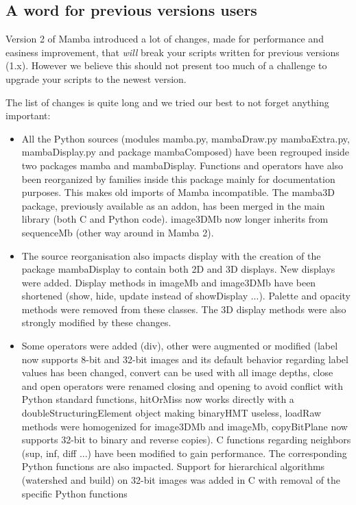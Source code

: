 \documentclass[a4paper,10pt,oneside]{article}
\begin{document}
\subsection{A word for previous versions users}
\label{cha:change_mamba2}

Version 2 of Mamba introduced a lot of changes, made for performance and
easiness improvement, that \emph{will} break your scripts written for previous
versions (1.x). However we believe this should not present too much of a
challenge to upgrade your scripts to the newest version.

The list of changes is quite long and we tried our best to not forget
anything important:
\begin{itemize}
\item All the Python sources (modules mamba.py, mambaDraw.py mambaExtra.py,
mambaDisplay.py and package mambaComposed) have been regrouped inside two packages
mamba and mambaDisplay. Functions and operators have also been reorganized
by families inside this package mainly for documentation purposes. This makes old
imports of Mamba incompatible. The mamba3D package, previously available as an
addon, has been merged in the main library (both C and Python code). image3DMb 
now longer inherits from sequenceMb (other way around in Mamba 2).
\item The source reorganisation also impacts display with the creation of
the package mambaDisplay to contain both 2D and 3D displays. New displays were
added. Display methods in imageMb and image3DMb have been shortened (show,
hide, update instead of showDisplay ...). Palette and opacity methods were
removed from these classes. The 3D display methods were also strongly
modified by these changes.
\item Some operators were added (div), other were augmented or modified 
(label now supports 8-bit and 32-bit images and its default behavior regarding
label values has been changed, convert can be used with all image depths, close
and open operators were renamed closing and opening to avoid conflict with
Python standard functions, hitOrMiss now works directly with a
doubleStructuringElement object making binaryHMT useless, loadRaw methods were
homogenized for image3DMb and imageMb, copyBitPlane now supports 32-bit to
binary and reverse copies). C functions regarding neighbors (sup, inf, diff ...)
have been modified to gain performance. The corresponding Python functions are
also impacted. Support for hierarchical algorithms (watershed and build) on
32-bit images was added in C with removal of the specific Python functions

\end{itemize}
\end{document}
